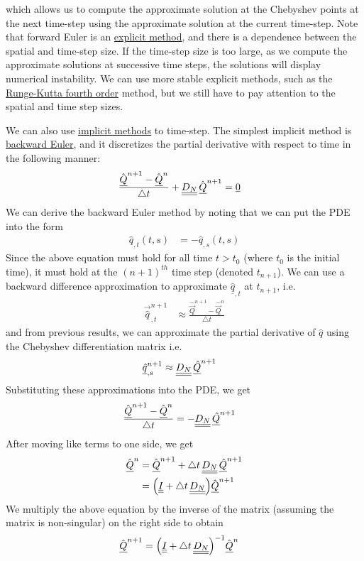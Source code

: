 which allows us to compute the approximate solution at the Chebyshev points at the next time-step using the approximate solution at the current time-step.
Note that forward Euler is an \underline{explicit method}, and there is a dependence between the spatial and time-step size. 
If the time-step size is too large, as we compute the approximate solutions at successive time steps, the solutions will display numerical instability. 
We can use more stable explicit methods, such as the \underline{Runge-Kutta fourth order} method, but we still have to pay attention to the spatial and time step sizes.
\par 
We can also use \underline{implicit methods} to time-step.
The simplest implicit method is \underline{backward Euler}, and it discretizes the partial derivative with respect to time in the following manner:
\begin{align*}
	\frac{\hat{{\underline{Q}}}^{n+1} - \hat{{\underline{Q}}}^{n}}{\triangle t} + {\underline{\underline{D_{N}}}} \, \hat{{\underline{Q}}}^{n+1} & = {\underline{0}}
\end{align*}
We can derive the backward Euler method by noting that we can put the PDE into the form
\begin{align*}
	\hat{q}_{, t}(t, s) & = -\hat{q}_{, s}(t, s)
\end{align*}
Since the above equation must hold for all time $t > t_{0}$ (where $t_0$ is the initial time), it must hold at the $(n+1)^{th}$ time step (denoted $t_{n+1}$).
We can use a backward difference approximation to approximate $\underline{\hat{q}}_{, t}$ at $t_{n+1}$, i.e.
\begin{align*}
	\vec{\hat{q}}_{, t}^{n+1} & \approx \frac{\hat{\vec{Q}}^{n+1} - \hat{\vec{Q}}^{n}}{\triangle t}
\end{align*}
and from previous results, we can approximate the partial derivative of $\hat{q}$ using the Chebyshev differentiation matrix i.e.
\begin{align*}
	{\underline{\hat{q}}}_{, s}^{n+1} & \approx {\underline{\underline{D_{N}}}} \, {\underline{\hat{Q}}}^{n+1} 
\end{align*}
Substituting these approximations into the PDE, we get
\begin{align*}
	\frac{\hat{{\underline{Q}}}^{n+1} - \hat{{\underline{Q}}}^{n}}{\triangle t} & = -{\underline{\underline{D_{N}}}} \, {\underline{\hat{Q}}}^{n+1} 
\end{align*}
After moving like terms to one side, we get
\begin{align*}
	\hat{{\underline{Q}}}^{n} & = \hat{{\underline{Q}}}^{n+1} + \triangle t \, {\underline{\underline{D_{N}}}} \, {\underline{\hat{Q}}}^{n+1} \\
					  & = \Big( {\underline{\underline{I}}} +  \triangle t \, {\underline{\underline{D_{N}}}} \Big) \hat{{\underline{Q}}}^{n+1}
\end{align*}
We multiply the above equation by the inverse of the matrix (assuming the matrix is non-singular) on the right side to obtain
\begin{align*}
	\hat{{\underline{Q}}}^{n+1} & = \Big( {\underline{\underline{I}}} +  \triangle t \, {\underline{\underline{D_{N}}}} \Big)^{-1} \hat{{\underline{Q}}}^{n}
\end{align*}